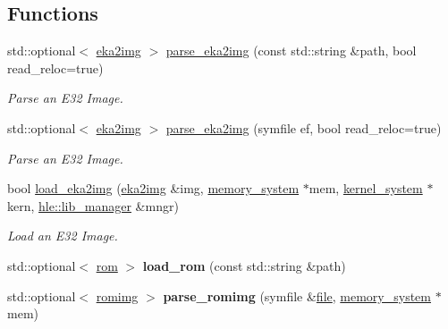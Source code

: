 \subsection*{Functions}
\begin{DoxyCompactItemize}
\item 
std\+::optional$<$ \mbox{\hyperlink{structeka2l1_1_1loader_1_1eka2img}{eka2img}} $>$ \mbox{\hyperlink{namespaceeka2l1_1_1loader_ad99ba37ca491b1aadc1fdb7358119e69}{parse\+\_\+eka2img}} (const std\+::string \&path, bool read\+\_\+reloc=true)
\begin{DoxyCompactList}\small\item\em Parse an E32 Image. \end{DoxyCompactList}\item 
std\+::optional$<$ \mbox{\hyperlink{structeka2l1_1_1loader_1_1eka2img}{eka2img}} $>$ \mbox{\hyperlink{namespaceeka2l1_1_1loader_ad995aa3132ef27f5c3ff776c632eaf28}{parse\+\_\+eka2img}} (symfile ef, bool read\+\_\+reloc=true)
\begin{DoxyCompactList}\small\item\em Parse an E32 Image. \end{DoxyCompactList}\item 
\mbox{\label{namespaceeka2l1_1_1loader_a163279f77bbe87c4b5d308d525cbc62e}} 
bool \mbox{\hyperlink{namespaceeka2l1_1_1loader_a163279f77bbe87c4b5d308d525cbc62e}{load\+\_\+eka2img}} (\mbox{\hyperlink{structeka2l1_1_1loader_1_1eka2img}{eka2img}} \&img, \mbox{\hyperlink{classeka2l1_1_1memory__system}{memory\+\_\+system}} $\ast$mem, \mbox{\hyperlink{classeka2l1_1_1kernel__system}{kernel\+\_\+system}} $\ast$kern, \mbox{\hyperlink{classeka2l1_1_1hle_1_1lib__manager}{hle\+::lib\+\_\+manager}} \&mngr)
\begin{DoxyCompactList}\small\item\em Load an E32 Image. \end{DoxyCompactList}\item 
\mbox{\label{namespaceeka2l1_1_1loader_a941141f1261ecda4ccef48abfb58b8ed}} 
std\+::optional$<$ \mbox{\hyperlink{structeka2l1_1_1loader_1_1rom}{rom}} $>$ {\bfseries load\+\_\+rom} (const std\+::string \&path)
\item 
\mbox{\label{namespaceeka2l1_1_1loader_a4efc3ae422a4c59bff3beea7b700a25f}} 
std\+::optional$<$ \mbox{\hyperlink{structeka2l1_1_1loader_1_1romimg}{romimg}} $>$ {\bfseries parse\+\_\+romimg} (symfile \&\mbox{\hyperlink{structeka2l1_1_1file}{file}}, \mbox{\hyperlink{classeka2l1_1_1memory__system}{memory\+\_\+system}} $\ast$mem)

\end{DoxyCompactItemize}
